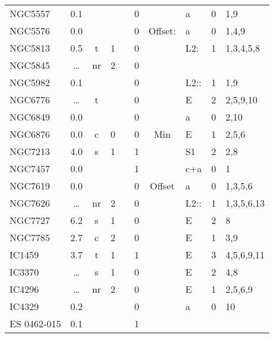 \begin{tabular}{lcccccclll}
NGC5557     & 0.1 &     &    &               & 0 &          & a & 0  & 1,9             \\
NGC5576     & 0.0 &     &    &               & 0 & Offset:  & a & 0  & 1,4,9           \\
NGC5813     & 0.5 & t   & 1  &               & 0 &          & L2:    & 1  & 1,3,4,5,8         \\
NGC5845     & \dots &nr & 2  &               & 0 &          & &    &               \\
NGC5982     & 0.1 &     &    &               & 0 &          & L2::   & 1  & 1,9               \\
NGC6776     & \dots &t  &    &               & 0 &          & E & 2  & 2,5,9,10          \\
NGC6849     & 0.0 &     &    &               & 0 &          & a & 0  & 2,10                   \\
NGC6876     & 0.0 & c   & 0  &               & 0 & Min      & E & 1  & 2,5,6         \\
NGC7213     & 4.0 & s   & 1  &               & 1           &          & S1     & 2  & 2,8               \\
NGC7457     & 0.0 &     &    &               & 1           &          & c+a    & 0  & 1             \\
NGC7619     & 0.0 &     &    &               & 0 & Offset   & a & 0  & 1,3,5,6               \\
NGC7626     & \dots &nr & 2  &               & 0 &          & L2::   & 1  & 1,3,5,6,13      \\
NGC7727     & 6.2 & s   & 1  &               & 0 &          & E & 2  & 8               \\
NGC7785     & 2.7 & c   & 2  &               & 0 &          & E & 1  & 3,9                     \\
IC1459      & 3.7 & t   & 1  &               & 1           &          & E & 3  & 4,5,6,9,11    \\
IC3370      & \dots &s  & 1  &               & 0 &          & E & 2  & 4,8                \\
IC4296      & \dots &nr & 2  &               & 0 &          & E & 1  & 2,5,6,9         \\
IC4329      & 0.2 &     &    &               & 0 &          & a & 0  & 10              \\
ES 0462-015 & 0.1 &     &    &               & 1           &          & &    &                \\
\end{tabular}
